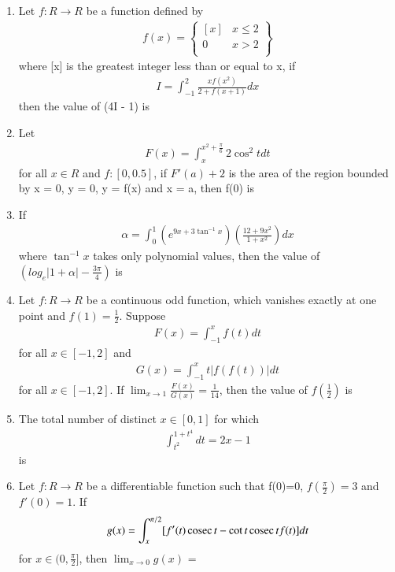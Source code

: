 \begin{enumerate}[label=\arabic*.,ref=\thesubsection.\theenumi]
\item Let $f: R \to R$ be a function defined by 
\begin{align*}
f(x) = 
\left\lbrace
\begin{array}{ll}
      [x] & x \leq 2\\
      0 & x > 2\\
\end{array}
\right\rbrace
\end{align*}
where [x] is the greatest integer less than or equal to x, if 
\begin{align*}
I = \int_{-1}^{2}\frac{xf(x^2)}{2 + f(x + 1)}dx
\end{align*}
then the value of (4I - 1) is

\item Let 
\begin{align*}
F(x) = \int_{x}^{x^2 + \frac{\pi}{6}}2\cos^{2}t dt
\end{align*}
for all $x \in R$ and $f: [0, 0.5]$, if $F'(a) + 2$ is the area of the region bounded by x = 0, y = 0, y = f(x) and x = a, then f(0) is

\item If 
\begin{align*}
\alpha = \int_{0}^{1}(e^{9x + 3\tan^{-1}x})\left(\frac{12 + 9x^2}{1 + x^2}\right)dx
\end{align*}
where $\tan^{-1}x$ takes only polynomial values, then the value of $\left( log_e|1 + \alpha| - \frac{3\pi}{4}\right)$ is

\item Let $f: R \to R$ be a continuous odd function, which vanishes exactly at one point and $f(1) = \frac{1}{2}$. Suppose 
\begin{align*}
F(x) = \int_{-1}^{x}f(t)dt
\end{align*}
for all $x \in [-1, 2]$  and
\begin{align*}
G(x) = \int_{-1}^{x}t|f(f(t))|dt
\end{align*}
for all $x \in [-1, 2]$. If $\lim_{x \to 1}\frac{F(x)}{G(x)} = \frac{1}{14}$, then the value of $f(\frac{1}{2})$ is

\item The total number of distinct $x \in [0, 1]$ for which 
\begin{align*}
\int_{t^2}^{1 + t^4}dt = 2x - 1
\end{align*}
is

\item Let $f: R \to R$ be a differentiable function such that f(0)=0, $f(\frac{\pi}{2}) = 3$ and $f'(0) = 1$. If
\begin{align*}
g(x)  = \int_{x}^{\pi/2}[f'(t)\,\text{cosec}\, t - \cot t \,\text{cosec}\, t f(t)]dt
\end{align*}
for $x \in (0, \frac{\pi}{2}]$, then $\lim_{x \to 0}g(x)$ =


\end{enumerate}
